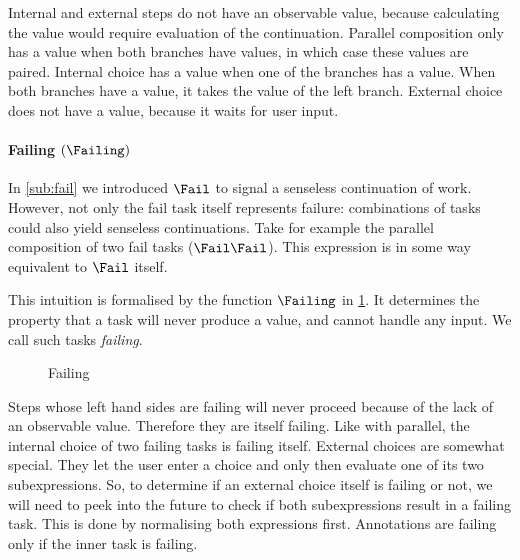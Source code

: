 Internal and external steps do not have an observable value, because calculating the value would require evaluation of the continuation.
Parallel composition only has a value when both branches have values, in which case these values are paired.
Internal choice has a value when one of the branches has a value.
When both branches have a value, it takes the value of the left branch.
External choice does not have a value, because it waits for user input.



\paragraph{Failing $(\Failing)$}

In \cref{sub:fail} we introduced $\Fail$ to signal a senseless continuation of work.
However, not only the fail task itself represents failure:
combinations of tasks could also yield senseless continuations.
Take for example the parallel composition of two fail tasks ($\Fail \And \Fail$).
This expression is in some way equivalent to $\Fail$ itself.

This intuition is formalised by the function $\Failing$ in \cref{fig:observation-failing}.
It determines the property that a task
will never produce a value, and
cannot handle any input.
We call such tasks \emph{failing}.

\begin{figure}[h]
  \small
  \caption{Failing} \label{fig:observation-failing}
\end{figure}

Steps whose left hand sides are failing will never proceed because of the lack of an observable value.
Therefore they are itself failing.
Like with parallel, the internal choice of two failing tasks is failing itself.
External choices are somewhat special.
They let the user enter a choice and only then evaluate one of its two subexpressions.
So, to determine if an external choice itself is failing or not,
we will need to peek into the future to check if both subexpressions result in a failing task.
This is done by normalising both expressions first.
Annotations are failing only if the inner task is failing.



